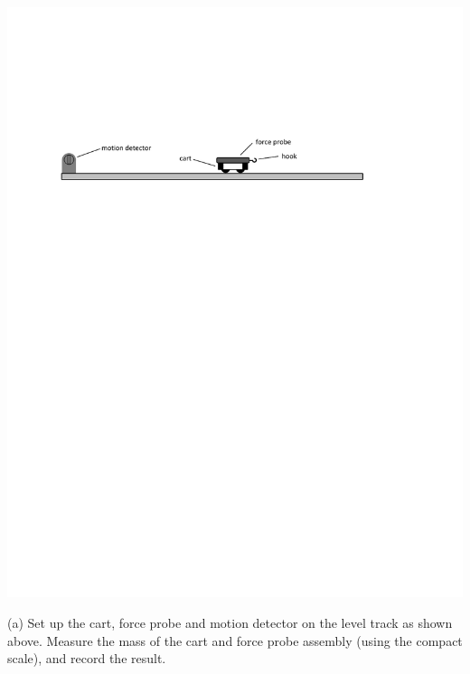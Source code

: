 \vspace{-0.2cm}
{\par\centering \includegraphics{force1/cart_and_sensors.pdf} \par}

(a) Set up the cart, force probe and motion detector on the level track as shown above. 
Measure the mass of the cart and force probe assembly (using the compact scale), and record the result.
\answerspace{10mm}




